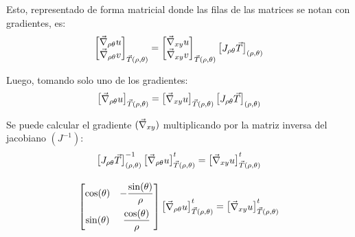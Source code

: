 Esto, representado de forma matricial donde las filas de las matrices se notan con gradientes, es:
\begin{equation*}
    \begin{bmatrix}
        \Vec{\nabla}_{\rho\theta} u
        \\
        \Vec{\nabla}_{\rho\theta} v
    \end{bmatrix}_{\Vec{T}(\rho,\theta)}
    =
    \begin{bmatrix}
        \Vec{\nabla}_{xy} u
        \\
        \Vec{\nabla}_{xy} v
    \end{bmatrix}_{\Vec{T}(\rho,\theta)}
    \begin{bmatrix}
        J_{\rho\theta} \Vec{T}
    \end{bmatrix}_{(\rho,\theta)}
\end{equation*}

Luego, tomando solo uno de los gradientes:
\begin{equation*}
    \begin{bmatrix}
        \Vec{\nabla}_{\rho\theta} u
    \end{bmatrix}_{\Vec{T}(\rho,\theta)}
    =
    \begin{bmatrix}
        \Vec{\nabla}_{xy} u
    \end{bmatrix}_{\Vec{T}(\rho,\theta)}
    \begin{bmatrix}
        J_{\rho\theta} \Vec{T}
    \end{bmatrix}_{(\rho,\theta)}
\end{equation*}

Se puede calcular el gradiente $(\Vec{\nabla}_{xy})$ multiplicando por la matriz inversa del jacobiano $(J^{-1})$:
\begin{gather*}
    \begin{bmatrix}
        J_{\rho\theta} \Vec{T}
    \end{bmatrix}_{(\rho,\theta)}^{-1}
    \begin{bmatrix}
        \Vec{\nabla}_{\rho\theta} u
    \end{bmatrix}_{\Vec{T}(\rho,\theta)}^t
    =
    \begin{bmatrix}
        \Vec{\nabla}_{xy} u
    \end{bmatrix}_{\Vec{T}(\rho,\theta)}^t
    \\[1em]
    \begin{bmatrix}
        \cos(\theta) & -\dfrac{\sin(\theta)}{\rho}
        \\[1em]
        \sin(\theta) & \dfrac{\cos(\theta)}{\rho}
    \end{bmatrix}
    \begin{bmatrix}
        \Vec{\nabla}_{\rho\theta} u
    \end{bmatrix}_{\Vec{T}(\rho,\theta)}^t
    =
    \begin{bmatrix}
        \Vec{\nabla}_{xy} u
    \end{bmatrix}_{\Vec{T}(\rho,\theta)}^t
\end{gather*}

